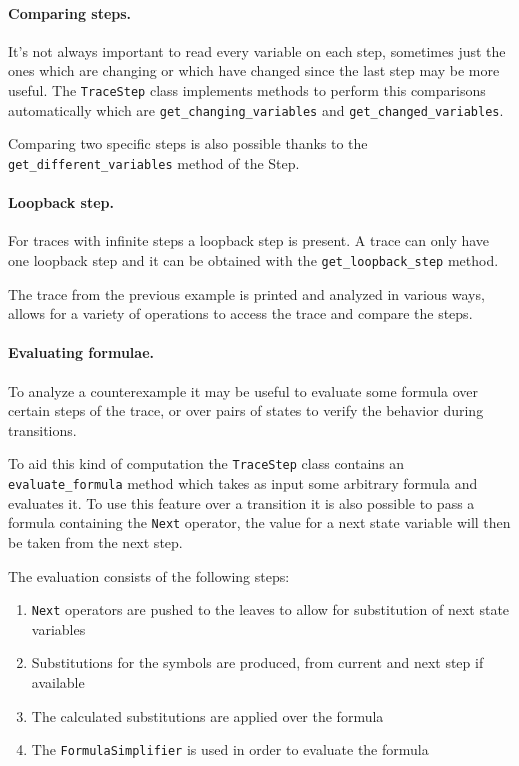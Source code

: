 \paragraph*{Comparing steps.}
It's not always important to read every variable on each step, sometimes just the ones which are changing or which have changed since the last step may be more useful.
The \texttt{TraceStep} class implements methods to perform this comparisons automatically which are \texttt{get\_changing\_variables} and \texttt{get\_changed\_variables}.

Comparing two specific steps is also possible thanks to the \texttt{get\_different\_variables} method of the Step.

\paragraph*{Loopback step.}
For traces with infinite steps a loopback step is present. A trace can only have one loopback step and it can be obtained with the \texttt{get\_loopback\_step} method.

\begin{listing}
    \label{alg:model-checking-traces}
    \caption{The trace from the previous example is printed and analyzed in various ways, \pyvmt{} allows for a variety of operations to access the trace and compare the steps.}
\end{listing}

\paragraph*{Evaluating formulae.}
To analyze a counterexample it may be useful to evaluate some formula over certain steps of the trace, or over pairs of states to verify the behavior during transitions.

To aid this kind of computation the \texttt{TraceStep} class contains an \texttt{evaluate\_formula} method which takes as input some arbitrary \pysmt{} formula and evaluates it.
To use this feature over a transition it is also possible to pass a formula containing the \texttt{Next} operator, the value for a next state variable will then be taken from the next step.

The evaluation consists of the following steps:
\begin{enumerate}
    \item \texttt{Next} operators are pushed to the leaves to allow for substitution of next state variables
    \item Substitutions for the symbols are produced, from current and next step if available
    \item The calculated substitutions are applied over the formula
    \item The \texttt{FormulaSimplifier} is used in order to evaluate the formula
\end{enumerate}

